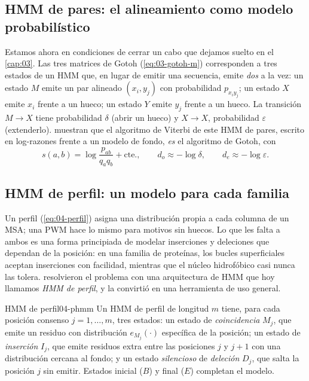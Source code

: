 \subsection{HMM de pares: el alineamiento como modelo probabilístico}

Estamos ahora en condiciones de cerrar un cabo que dejamos suelto en el \cref{cap:03}. Las tres matrices de Gotoh (\cref{eq:03-gotoh-m}) corresponden a tres estados de un HMM que, en lugar de emitir una secuencia, emite \emph{dos} a la vez: un estado $M$ emite un par alineado $(x_i,y_j)$ con probabilidad $p_{x_iy_j}$; un estado $X$ emite $x_i$ frente a un hueco; un estado $Y$ emite $y_j$ frente a un hueco. La transición $M\to X$ tiene probabilidad $\delta$ (abrir un hueco) y $X\to X$, probabilidad $\varepsilon$ (extenderlo). \textcite{c04-durbin1998} muestran que el algoritmo de Viterbi de este HMM de pares, escrito en log-razones frente a un modelo de fondo, \emph{es} el algoritmo de Gotoh, con
\[
s(a,b)=\log\frac{p_{ab}}{q_aq_b}+\text{cte.},\qquad d_o\approx-\log\delta,\qquad d_e\approx-\log\varepsilon.
\]

\subsection{HMM de perfil: un modelo para cada familia}

Un perfil (\cref{eq:04-perfil}) asigna una distribución propia a cada columna de un MSA; una PWM hace lo mismo para motivos sin huecos. Lo que les falta a ambos es una forma principiada de modelar inserciones y deleciones que dependan de la posición: en una familia de proteínas, los bucles superficiales aceptan inserciones con facilidad, mientras que el núcleo hidrofóbico casi nunca las tolera. \textcite{c04-krogh1994} resolvieron el problema con una arquitectura de HMM que hoy llamamos \emph{HMM de perfil}, y \textcite{c04-eddy1998} la convirtió en una herramienta de uso general.

\begin{definicion}{HMM de perfil}{04-phmm}
Un HMM de perfil de longitud $m$ tiene, para cada posición consenso $j=1,\dots,m$, tres estados: un estado de \emph{coincidencia} $M_j$, que emite un residuo con distribución $e_{M_j}(\cdot)$ específica de la posición; un estado de \emph{inserción} $I_j$, que emite residuos extra entre las posiciones $j$ y $j+1$ con una distribución cercana al fondo; y un estado \emph{silencioso} de \emph{deleción} $D_j$, que salta la posición $j$ sin emitir. Estados inicial ($B$) y final ($E$) completan el modelo.
\end{definicion}

